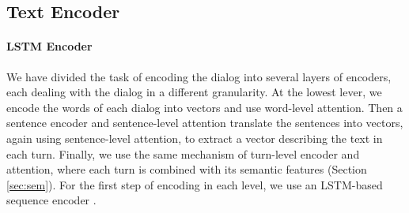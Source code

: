 \subsection{Text Encoder}

\paragraph*{LSTM Encoder}
We have divided the task of encoding the dialog into several 
layers of encoders, each dealing with the dialog in a different granularity. 
At the lowest lever, we encode the words of each dialog into vectors 
and use word-level attention. Then a sentence encoder and sentence-level attention 
translate the sentences into vectors, again using sentence-level attention, to extract a vector describing the text 
in each turn. Finally, we use the same mechanism of turn-level encoder and attention, where each turn is combined 
with its semantic features (Section \ref{sec:sem}). 
For the first step of encoding in each level, we use an LSTM-based sequence encoder \cite{lstm,birnn}. 







